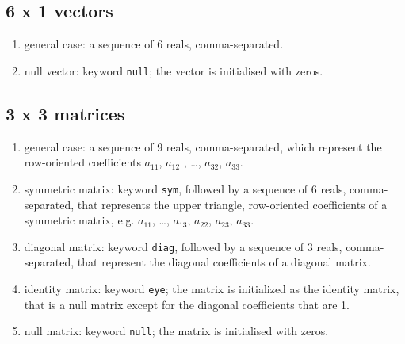 \subsection{6 x 1 vectors}
\begin{enumerate}
    \item general case: a sequence of 6 reals, comma-separated.
    \item null vector: keyword \texttt{null}; the vector is initialised 
    with zeros.	
\end{enumerate}
\subsection{3 x 3 matrices}
\begin{enumerate}
    \item general case: a sequence of 9 reals, comma-separated, which
    represent the row-oriented coefficients $ a_{11} $, $ a_{12}$ ,
    \ldots, $ a_{32} $, $ a_{33} $.
    \item symmetric matrix: keyword \texttt{sym}, followed by a sequence
    of 6 reals, comma-separated, that represents the upper triangle, 
    row-oriented coefficients of a symmetric matrix, 
    e.g. $ a_{11} $, \ldots , $ a_{13} $, $ a_{22} $, $ a_{23} $, $ a_{33} $.
    \item diagonal matrix: keyword \texttt{diag}, followed by a sequence
    of 3 reals, comma-separated, that represent the diagonal coefficients 
    of a diagonal matrix.
    \item identity matrix: keyword \texttt{eye}; the matrix is initialized
    as the identity matrix, that is a null matrix except for the diagonal 
    coefficients that are 1.
    \item null matrix: keyword \texttt{null}; the matrix is initialised 
    with zeros.
\end{enumerate}

